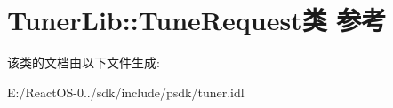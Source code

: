 \hypertarget{class_tuner_lib_1_1_tune_request}{}\section{Tuner\+Lib\+:\+:Tune\+Request类 参考}
\label{class_tuner_lib_1_1_tune_request}


该类的文档由以下文件生成\+:\begin{DoxyCompactItemize}
\item 
E\+:/\+React\+O\+S-\/0../sdk/include/psdk/tuner.\+idl\end{DoxyCompactItemize}
